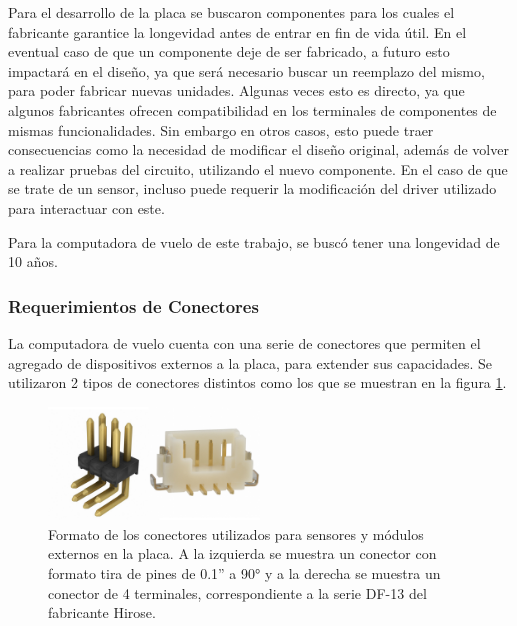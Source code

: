 
Para el desarrollo de la placa se buscaron componentes para los cuales el fabricante garantice la longevidad antes de entrar en fin de vida útil. En el eventual caso de que un componente deje de ser fabricado, a futuro esto impactará en el diseño, ya que será necesario buscar un reemplazo del mismo, para poder fabricar nuevas unidades. Algunas veces esto es directo, ya que algunos fabricantes ofrecen compatibilidad en los terminales de componentes de mismas funcionalidades. Sin embargo en otros casos, esto puede traer consecuencias como la necesidad de modificar el diseño original, además de volver a realizar pruebas del circuito, utilizando el nuevo componente. En el caso de que se trate de un sensor, incluso puede requerir la modificación del driver utilizado para interactuar con este.

Para la computadora de vuelo de este trabajo, se buscó tener una longevidad de 10 años.


\subsubsection{Requerimientos de Conectores}


La computadora de vuelo cuenta con una serie de conectores que permiten el agregado de dispositivos externos a la placa, para extender sus capacidades. Se utilizaron 2 tipos de conectores distintos como los que se muestran en la figura \ref{fig:conectores_dupon_df_13}.

\begin{figure}[htb]
    \centering
    \includegraphics[width=0.5\textwidth]{img/conectores_dupon_df_13.png}
    \caption{Formato de los conectores utilizados para sensores y módulos externos en la placa. A la izquierda se muestra un conector con formato tira de pines de 0.1” a 90° y a la derecha se muestra un conector de 4 terminales, correspondiente a la serie DF-13 del fabricante Hirose.}
    \label{fig:conectores_dupon_df_13}
\end{figure}

